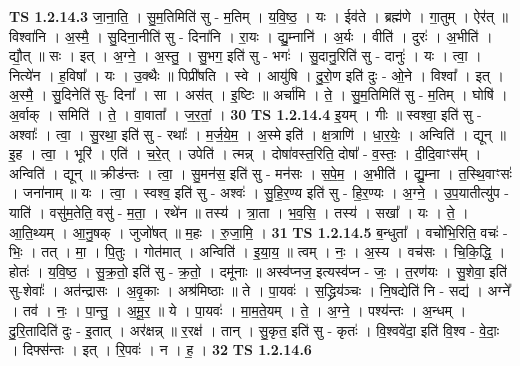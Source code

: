 \documentclass[17pt]{extarticle}
\begin{document}
                                \textbf{ TS 1.2.14.3} \newline
                  जा॒ना॒ति॒ । सु॒म॒तिमिति॑ सु - म॒तिम् । य॒वि॒ष्ठ॒ । यः । ईव॑ते । ब्रह्म॑णे । गा॒तुम् । ऐर॑त् ॥ विश्वा॑नि । अ॒स्मै॒ । सु॒दिना॒नीति॑ सु - दिना॑नि । रा॒यः । द्यु॒म्नानि॑ । अ॒र्यः । वीति॑ । दुरः॑ । अ॒भीति॑ । द्यौ॒त् ॥ सः । इत् । अ॒ग्ने॒ । अ॒स्तु॒ । सु॒भग॒ इति॑ सु - भगः॑ । सु॒दानु॒रिति॑ सु - दानुः॑ । यः । त्वा॒ । नित्ये॑न । ह॒विषा᳚ । यः । उ॒क्थैः ॥ पिप्री॑षति । स्वे । आयु॑षि । दु॒रो॒ण इति॑ दुः - ओ॒ने । विश्वा᳚ । इत् । अ॒स्मै॒ । सु॒दिनेति॑ सु- दिना᳚ । सा । अस॑त् । इ॒ष्टिः ॥ अर्चा॑मि । ते॒ । सु॒म॒तिमिति॑ सु - म॒तिम् । घोषि॑ । अ॒र्वाक् । समिति॑ । ते॒ । वा॒वाता᳚ । ज॒र॒तां॒ । \textbf{  30} \newline
                  \newline
                                \textbf{ TS 1.2.14.4} \newline
                  इ॒यम् । गीः ॥ स्वश्वा॒ इति॑ सु - अश्वाः᳚ । त्वा॒ । सु॒रथा॒ इति॑ सु - रथाः᳚ । म॒र्ज॒ये॒म॒ । अ॒स्मे इति॑ । क्ष॒त्राणि॑ । धा॒र॒येः॒ । अन्विति॑ । द्यून् ॥ इ॒ह । त्वा॒ । भूरि॑ । एति॑ । च॒रे॒त् । उपेति॑ । त्‍मन्न् । दोषा॑वस्त॒रिति॒ दोषा᳚ - व॒स्तः॒ । दी॒दि॒वाꣳस᳚म् । अन्विति॑ । द्यून् ॥ क्रीड॑न्तः । त्वा॒ । सु॒मन॑स॒ इति॑ सु - मन॑सः । स॒पे॒म॒ । अ॒भीति॑ । द्यु॒म्ना । त॒स्थि॒वाꣳसः॑ । जना॑नाम् ॥ यः । त्वा॒ । स्वश्व॒ इति॑ सु - अश्वः॑ । सु॒हि॒र॒ण्य इति॑ सु - हि॒र॒ण्यः । अ॒ग्ने॒ । उ॒प॒यातीत्यु॑प - याति॑ । वसु॑म॒तेति॒ वसु॑ - म॒ता॒ । रथे॑न ॥ तस्य॑ । त्रा॒ता । भ॒व॒सि॒ । तस्य॑ । सखा᳚ । यः । ते॒ । आ॒ति॒थ्यम् । आ॒नु॒षक् । जुजो॑षत् ॥ म॒हः । रु॒जा॒मि॒ । \textbf{  31} \newline
                  \newline
                                \textbf{ TS 1.2.14.5} \newline
                  ब॒न्धुता᳚ । वचो॑भि॒रिति॒ वचः॑ - भिः॒ । तत् । मा॒ । पि॒तुः । गोत॑मात् । अन्विति॑ । इ॒या॒य॒ ॥ त्वम् । नः॒ । अ॒स्य । वच॑सः । चि॒कि॒द्धि॒ । होतः॑ । य॒वि॒ष्ठ॒ । सु॒क्र॒तो॒ इति॑ सु - क्र॒तो॒ । दमू॑नाः ॥ अस्व॑प्नज॒ इत्यस्व॑प्न - जः॒ । त॒रण॑यः । सु॒शेवा॒ इति॑ सु-शेवाः᳚ । अत॑न्द्रासः । अ॒वृ॒काः । अश्र॑मिष्ठाः ॥ ते । पा॒यवः॑ । स॒द्ध्रिय॑ञ्चः । नि॒षद्येति॑ नि - सद्य॑ । अग्ने᳚ । तव॑ । नः॒ । पा॒न्तु॒ । अ॒मू॒र॒ ॥ ये । पा॒यवः॑ । मा॒म॒ते॒यम् । ते॒ । अ॒ग्ने॒ । पश्य॑न्तः । अ॒न्धम् । दु॒रि॒तादिति॑ दुः - इ॒तात् । अर॑क्षन्न् ॥ र॒रक्ष॑ । तान् । सु॒कृत॒ इति॑ सु - कृतः॑ । वि॒श्ववे॑दा॒ इति॑ वि॒श्व - वे॒दाः॒ । दिफ्स॑न्तः । इत् । रि॒पवः॑ । न । ह॒ । \textbf{  32} \newline
                  \newline
                                \textbf{ TS 1.2.14.6} \newline
\end{document}
